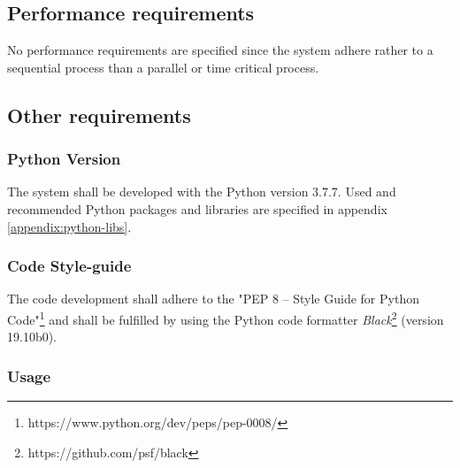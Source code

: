 \documentclass[a4paper]{article}
\begin{document}
\clearpage
\subsection{Performance requirements}
No performance requirements are specified since the system adhere rather to a sequential process than a parallel or time critical process.

\subsection{Other requirements}
\subsubsection{Python Version}
The system shall be developed with the Python version 3.7.7. Used and recommended Python packages and libraries are specified in appendix \ref{appendix:python-libs}.


\subsubsection{Code Style-guide}
The code development shall adhere to the "PEP 8 -- Style Guide for Python Code"\footnote{https://www.python.org/dev/peps/pep-0008/} and shall be fulfilled by using the Python code formatter \textit{Black}\footnote{https://github.com/psf/black} (version 19.10b0).

\subsubsection{Usage}
\end{document}

